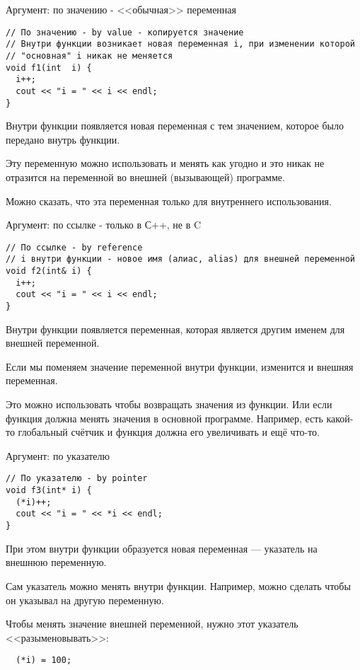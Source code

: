 \begin{frame}[t,fragile]{Аргумент: по значению - <<обычная>> переменная}
\begin{lstlisting}
// По значению - by value - копируется значение
// Внутри функции возникает новая переменная i, при изменении которой
// "основная" i никак не меняется
void f1(int  i) { 
  i++;    
  cout << "i = " << i << endl; 
}
\end{lstlisting}

Внутри функции появляется новая переменная с тем значением, которое было передано внутрь функции.

Эту переменную можно использовать и менять как угодно и это никак не отразится на
переменной во внешней (вызывающей) программе.

Можно сказать, что эта переменная только для внутреннего использования.  

\end{frame}

\begin{frame}[t,fragile]{Аргумент: по ссылке - только в С++, не в C}
\begin{lstlisting}
// По ссылке - by reference
// i внутри функции - новое имя (алиас, alias) для внешней переменной
void f2(int& i) { 
  i++;     
  cout << "i = " << i << endl;  
}
\end{lstlisting}

Внутри функции появляется переменная, которая является другим именем для
внешней переменной.

Если мы поменяем значение переменной внутри функции, изменится и внешняя переменная.

Это можно использовать чтобы возвращать значения из функции. 
Или если функция должна менять значения в основной программе.
Например, есть какой-то глобальный счётчик и функция должна его увеличивать и ещё что-то.
\end{frame}

\begin{frame}[t,fragile]{Аргумент: по указателю}
\begin{lstlisting}
// По указателю - by pointer
void f3(int* i) { 
  (*i)++;  
  cout << "i = " << *i << endl; 
}
\end{lstlisting}

При этом внутри функции образуется новая переменная --- указатель на внешнюю переменную.

Сам указатель можно менять внутри функции.
Например, можно сделать чтобы он указывал на другую переменную.

Чтобы менять значение внешней переменной, нужно этот указатель
<<разыменовывать>>:

\begin{lstlisting}
  (*i) = 100;   
\end{lstlisting}

\end{frame}

